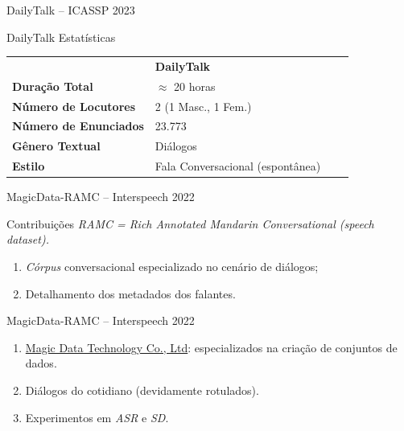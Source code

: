 \begin{frame}{DailyTalk -- ICASSP 2023}
  \begin{block}{DailyTalk Estatísticas}
    \begin{table}[ht]
      \centering
      \label{tab:DailyTalk}
      \small
      \begin{tabular}{@{}llll@{}}
        & \textbf{DailyTalk} \\
        \textbf{Duração Total}   & $\approx$ 20 horas \\
        \textbf{Número de Locutores} & 2 (1 Masc., 1 Fem.) \\
        \textbf{Número de Enunciados} & 23.773 \\
        \textbf{Gênero Textual} & Diálogos \\
        \textbf{Estilo} & Fala Conversacional (espontânea)  \\
      \end{tabular}
    \end{table}
  \end{block}
\end{frame}

\begin{frame}{MagicData-RAMC -- Interspeech 2022}
  \begin{block}{Contribuições}
    \textit{RAMC = Rich Annotated Mandarin Conversational (speech dataset).}
    \begin{enumerate}
      \item \textit{Córpus} conversacional especializado no cenário de diálogos;
      \item Detalhamento dos metadados dos falantes.
    \end{enumerate}
  \end{block}
\end{frame}

\begin{frame}{MagicData-RAMC -- Interspeech 2022}
  \begin{block}{}
    \begin{enumerate}
      \item<1-> \href{https://www.magicdatatech.com/}{Magic Data Technology Co., Ltd}:
        especializados na criação de conjuntos de dados.
      \item<2-> Diálogos do cotidiano (devidamente rotulados).
      \item<3-> Experimentos em \textit{ASR} e \textit{SD}.
    \end{enumerate}
  \end{block}
\end{frame}

